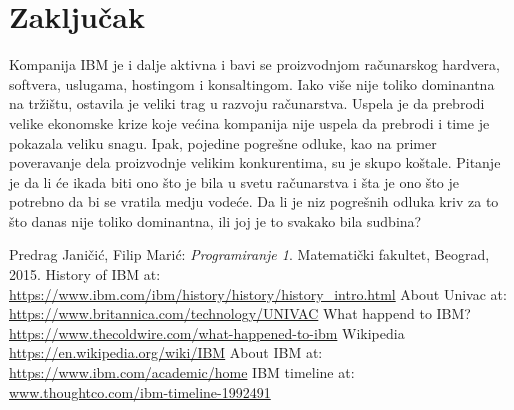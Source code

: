 \documentclass[a4paper]{article}
\begin{document}
\section{Zaključak}
Kompanija IBM je i dalje aktivna i bavi se proizvodnjom računarskog hardvera, softvera, uslugama, hostingom i konsaltingom. Iako više nije toliko dominantna na tržištu, ostavila je veliki trag u razvoju računarstva. Uspela je da prebrodi velike ekonomske krize koje većina kompanija nije uspela da prebrodi i time je pokazala veliku snagu. Ipak, pojedine pogrešne odluke, kao na primer poveravanje dela proizvodnje velikim konkurentima, su je skupo koštale. Pitanje je da li će ikada biti ono što je bila u svetu računarstva i šta je ono što je potrebno da bi se vratila medju vodeće. Da li je niz pogrešnih odluka kriv za to što danas nije toliko dominantna, ili joj je to svakako bila sudbina?


\renewcommand{\refname}{Literatura}
\begin{thebibliography}{10}

 Predrag Janičić, Filip Marić: \emph{Programiranje 1}. Matematički fakultet, Beograd, 2015. 
 History of IBM at:\\ \url{https://www.ibm.com/ibm/history/history/history_intro.html} 
 About Univac at:\\ \url{https://www.britannica.com/technology/UNIVAC} 
 What happend to IBM?\\ \url{https://www.thecoldwire.com/what-happened-to-ibm} 
 Wikipedia \url{https://en.wikipedia.org/wiki/IBM} %
 About IBM at: \url{https://www.ibm.com/academic/home} 
 IBM timeline at: \url{www.thoughtco.com/ibm-timeline-1992491}

\end{thebibliography}
\end{document}

